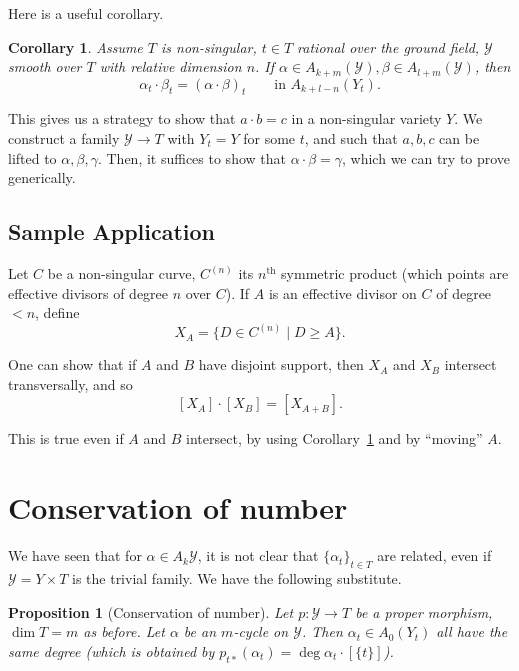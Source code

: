 \documentclass[leqno, openany]{memoir}
\newtheorem{cor}[thm]{Corollary}
\newtheorem{prop}[thm]{Proposition}
\theoremstyle{definition}
\theoremstyle{remark}
\theoremstyle{plain}
\theoremstyle{definition}
\theoremstyle{remark}
\newcommand{\mc}[1]{\mathcal{#1}}
\begin{document}
Here is a useful corollary.  \begin{cor}\label{cor:intfiber} Assume $T$ is
    non-singular, $t \in T$ rational over the ground field, $\mc{Y}$ smooth
    over $T$ with relative dimension $n$. If $\alpha \in A_{k+m}(\mc{Y}), \beta
    \in A_{l+m}(\mc{Y})$, then \[ \alpha_t \cdot \beta_t = { (\alpha \cdot
    \beta) }_t \qquad \text{in } A_{k+l-n}(Y_t). \] \end{cor}

This gives us a strategy to show that $a \cdot b=c$ in a non-singular variety
$Y$. We construct a family $\mc{Y} \to T$ with $Y_t=Y$ for some $t$, and such
that $a, b, c$ can be lifted to $\alpha, \beta, \gamma$. Then, it suffices to
show that $\alpha \cdot \beta=\gamma$, which we can try to prove generically.

\subsection{Sample Application}%


Let $C$ be a non-singular curve, $C^{(n)}$ its $n^{\text{th}}$ symmetric
product (which points are effective divisors of degree $n$ over $C$). If $A$ is
an effective divisor on $C$ of degree $<n$, define \[ X_A=\{D \in C^{(n)} \mid
D \geq A \}. \]

One can show that if $A$ and $B$ have disjoint support, then $X_A$ and $X_B$
intersect transversally, and so \[ [X_A] \cdot [X_B]=[X_{A+B}]. \]

This is true even if $A$ and $B$ intersect, by using
Corollary~\ref{cor:intfiber} and by ``moving'' $A$. 

\section{Conservation of number}

We have seen that for $\alpha \in A_k\mc{Y}$, it is not clear that
${\{\alpha_t\}}_{t \in T}$ are related, even if $\mc{Y}=Y \times T$ is the
trivial family.  We have the following substitute.

\begin{prop}[Conservation of number] Let $p\colon \mc{Y} \to T$ be a proper
    morphism, $\dim T=m$ as before. Let $\alpha$ be an $m$-cycle on $\mc{Y}$.
    Then $\alpha_t \in A_0(Y_t)$ all have the same degree (which is obtained by
    $p_{t\ast}(\alpha_t)=\deg \alpha_t\cdot [\{t\}]$).  \end{prop}
\end{document}

